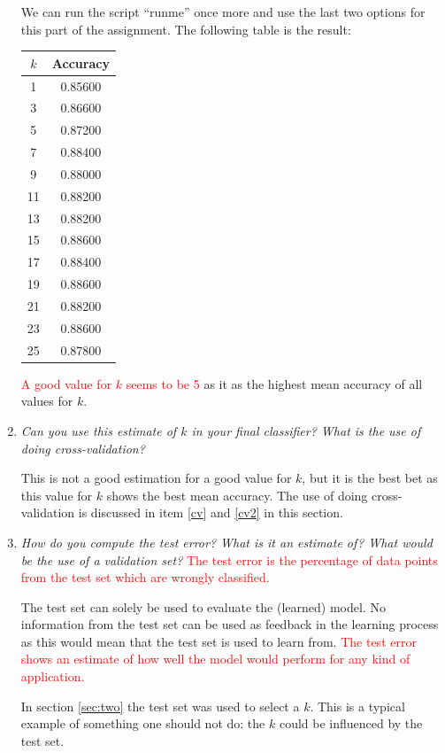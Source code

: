 \documentclass[a4paper,11pt]{article}
\newcommand{\highlightColor}{red}
\begin{document}
\begin{enumerate}
We can run the script ``runme'' once more and use the last two options for 
this part of the assignment.  The following table is the result:

\begin{tabular}{c | c}
\textbf{$k$} & \textbf{Accuracy} \\
\hline
1 &  0.85600\\ 
3 &  0.86600\\ 
5 &  0.87200\\ 
7 &  0.88400\\ 
9 &  0.88000\\ 
11&  0.88200\\ 
13&  0.88200\\ 
15&  0.88600\\ 
17&  0.88400\\ 
19&  0.88600\\ 
21&  0.88200\\ 
23&  0.88600\\ 
25&  0.87800\\ 
\end{tabular}

\textcolor{\highlightColor}{A good value for $k$ seems to be 5} as it as the highest mean accuracy of all
values for $k$.  

\item \textit{Can you use this estimate of $k$ in your final classifier? What is the use of doing cross-validation?}

This is not a good estimation for a good value for $k$, but it is the best 
bet as this value for $k$ shows the best mean accuracy.  The use of doing 
cross-validation is discussed in item \ref{cv} and \ref{cv2} in this section.  

\item \textit{ How do you compute the test error? What is it an estimate of? What would be the use of a validation
set? } 
\label{cv2}
\textcolor{\highlightColor}{The test error is the percentage of data points from the test set which 
are wrongly classified.}

The test set can solely be used to evaluate the (learned) model.  No
information from the test set can be used as feedback in the learning 
process as this would mean that the test set is used to learn from.  
\textcolor{\highlightColor}{The 
test error shows an estimate of how well the model would perform for
any kind of application.}

In section \ref{sec:two} the test set was used to select a $k$.  This is a
typical example of something one should not do: the $k$ could be influenced
by the test set.  


\end{enumerate}
\end{document}
